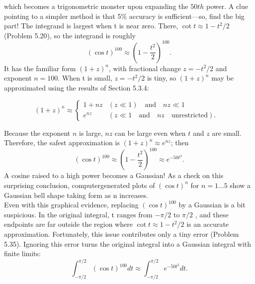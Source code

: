 \documentclass[fleqn]{book}
\newcounter{pro1}
\begin{document}
\Large \textrm{which becomes a trigonometric monster upon expanding the $50th$ power. 
A clue pointing to a simpler method is that 5\% accuracy is sufficient—so, 
find the big part! The integrand is largest when t is near zero. There,
$\cot t \approx 1-t^{2}/2$ (Problem 5.20), so the integrand is roughly}
\begin{equation}
(\cos t)^{100}\approx \left (1- \frac{t^{2}}{2} \right )^{100} . 
\end{equation}
\Large\textrm{It has the familiar form $(1 + z)^{n}$, with fractional change $z = −t^{2}/2$ and 
exponent $n = 100$. When t is small, $z = −t^{2}/2$ is tiny, so $(1 + z)^{n}$ may be 
approximated using the results of Section 5.3.4:}
\begin{flushleft}
\begin{equation}
 (1+z)^{n}\approx \left\{\begin{matrix} 1+nz &  (z\ll 1) \quad \textrm{and} \quad nz\ll 1 &\\ e ^{nz}& (z\ll 1 \quad \textrm{and} \quad nz \quad \textrm{unrestricted}) .& \end{matrix}\right.  
\end{equation}
\end{flushleft}
\Large \textrm{Because the exponent $n$ is large, $nz$ can be large even when $t$ and $z$ are 
small. Therefore, the safest approximation is $(1 + z)^{n}\approx e ^{nz}$; then} 
\begin{equation}
(\cos t)^{100}\approx \left (1- \frac{t^{2}}{2} \right )^{100} \approx e ^{-50t^{2}} .
\end{equation}
\Large\textrm{A cosine raised to a high power becomes a Gaussian! 
As a check on this surprising conclusion, computergenerated plots of $(\cos t)^{n}$ for $n = 1...5$ show a 
Gaussian bell shape taking form as n increases. \\
Even with this graphical evidence, replacing $(\cos t)^{100}$ by a Gaussian is a 
bit suspicious. In the original integral, t ranges from $-\pi /2$ to $\pi /2$ , and 
these endpoints are far outside the region where $\cot t \approx 1-t^{2}/2$ is an 
accurate approximation. Fortunately, this issue contributes only a tiny 
error (Problem 5.35). Ignoring this error turns the original integral into a 
Gaussian integral with finite limits: } 
\begin{equation}
\int_{-\pi /2}^{\pi /2}(\cos t)^{100}dt \approx \int_{-\pi /2}^{\pi /2} e ^{-50t^{2}}dt .
\end{equation}


\newpage 
\pagestyle{fancy} 
\renewcommand{\headrulewidth}{0pt} 
\fancyhf{} %
\end{document}
